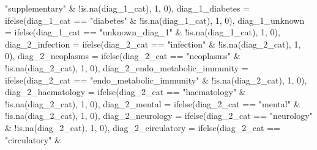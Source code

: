 \documentclass[
]{article}
\newenvironment{Shaded}{\begin{snugshade}}{\end{snugshade}}
\newcommand{\AttributeTok}[1]{\textcolor[rgb]{0.77,0.63,0.00}{#1}}
\newcommand{\DecValTok}[1]{\textcolor[rgb]{0.00,0.00,0.81}{#1}}
\newcommand{\FunctionTok}[1]{\textcolor[rgb]{0.00,0.00,0.00}{#1}}
\newcommand{\NormalTok}[1]{#1}
\newcommand{\SpecialCharTok}[1]{\textcolor[rgb]{0.00,0.00,0.00}{#1}}
\newcommand{\StringTok}[1]{\textcolor[rgb]{0.31,0.60,0.02}{#1}}
\begin{document}
\begin{Shaded}
\begin{Highlighting}[]
            \StringTok{"supplementary"} \SpecialCharTok{\&} \SpecialCharTok{!}\FunctionTok{is.na}\NormalTok{(diag\_1\_cat), }\DecValTok{1}\NormalTok{,}
            \DecValTok{0}\NormalTok{), }\AttributeTok{diag\_1\_diabetes =} \FunctionTok{ifelse}\NormalTok{(diag\_1\_cat }\SpecialCharTok{==}
            \StringTok{"diabetes"} \SpecialCharTok{\&} \SpecialCharTok{!}\FunctionTok{is.na}\NormalTok{(diag\_1\_cat), }\DecValTok{1}\NormalTok{, }\DecValTok{0}\NormalTok{),}
        \AttributeTok{diag\_1\_unknown =} \FunctionTok{ifelse}\NormalTok{(diag\_1\_cat }\SpecialCharTok{==} \StringTok{"unknown\_diag\_1"} \SpecialCharTok{\&}
            \SpecialCharTok{!}\FunctionTok{is.na}\NormalTok{(diag\_1\_cat), }\DecValTok{1}\NormalTok{, }\DecValTok{0}\NormalTok{), }\AttributeTok{diag\_2\_infection =} \FunctionTok{ifelse}\NormalTok{(diag\_2\_cat }\SpecialCharTok{==}
            \StringTok{"infection"} \SpecialCharTok{\&} \SpecialCharTok{!}\FunctionTok{is.na}\NormalTok{(diag\_2\_cat), }\DecValTok{1}\NormalTok{, }\DecValTok{0}\NormalTok{),}
        \AttributeTok{diag\_2\_neoplasms =} \FunctionTok{ifelse}\NormalTok{(diag\_2\_cat }\SpecialCharTok{==} \StringTok{"neoplasms"} \SpecialCharTok{\&}
            \SpecialCharTok{!}\FunctionTok{is.na}\NormalTok{(diag\_2\_cat), }\DecValTok{1}\NormalTok{, }\DecValTok{0}\NormalTok{), }\AttributeTok{diag\_2\_endo\_metabolic\_immunity =} \FunctionTok{ifelse}\NormalTok{(diag\_2\_cat }\SpecialCharTok{==}
            \StringTok{"endo\_metabolic\_immunity"} \SpecialCharTok{\&} \SpecialCharTok{!}\FunctionTok{is.na}\NormalTok{(diag\_2\_cat),}
            \DecValTok{1}\NormalTok{, }\DecValTok{0}\NormalTok{), }\AttributeTok{diag\_2\_haematology =} \FunctionTok{ifelse}\NormalTok{(diag\_2\_cat }\SpecialCharTok{==}
            \StringTok{"haematology"} \SpecialCharTok{\&} \SpecialCharTok{!}\FunctionTok{is.na}\NormalTok{(diag\_2\_cat), }\DecValTok{1}\NormalTok{,}
            \DecValTok{0}\NormalTok{), }\AttributeTok{diag\_2\_mental =} \FunctionTok{ifelse}\NormalTok{(diag\_2\_cat }\SpecialCharTok{==}
            \StringTok{"mental"} \SpecialCharTok{\&} \SpecialCharTok{!}\FunctionTok{is.na}\NormalTok{(diag\_2\_cat), }\DecValTok{1}\NormalTok{, }\DecValTok{0}\NormalTok{), }\AttributeTok{diag\_2\_neurology =} \FunctionTok{ifelse}\NormalTok{(diag\_2\_cat }\SpecialCharTok{==}
            \StringTok{"neurology"} \SpecialCharTok{\&} \SpecialCharTok{!}\FunctionTok{is.na}\NormalTok{(diag\_2\_cat), }\DecValTok{1}\NormalTok{, }\DecValTok{0}\NormalTok{),}
        \AttributeTok{diag\_2\_circulatory =} \FunctionTok{ifelse}\NormalTok{(diag\_2\_cat }\SpecialCharTok{==} \StringTok{"circulatory"} \SpecialCharTok{\&}

\end{Highlighting}
\end{Shaded}
\end{document}
